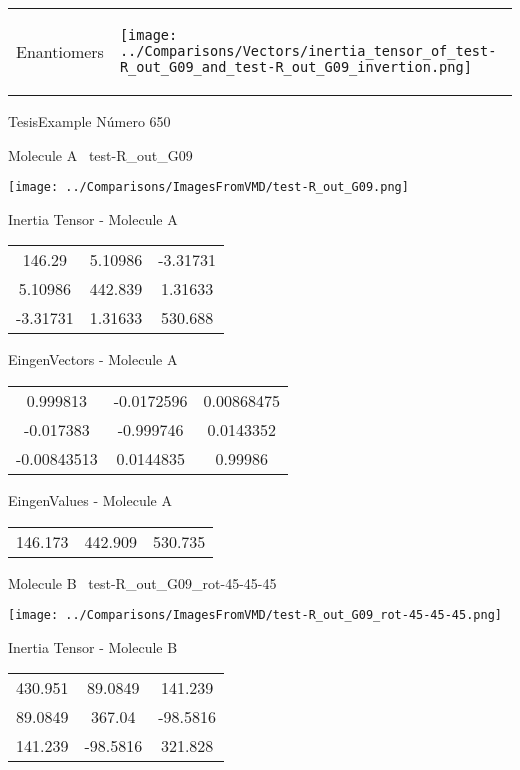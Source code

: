 \vtab[-5mm]
\begin{tabular}{*{2}{m{}}}
\begin{center}
\textcolor{NavyBlue}{\Large Enantiomers}
\end{center}
&
\begin{center}
\texttt{[image: ../Comparisons/Vectors/inertia\_tensor\_of\_test-R\_out\_G09\_and\_test-R\_out\_G09\_invertion.png]}
\end{center}
\end{tabular}

 \newpage

\vtab[-3cm]
\begin{center}
{\large TesisExample \tab Número 650}
\end{center}
\begin{multicols}{2}
\begin{center}

Molecule A \
test-R\_out\_G09

\texttt{[image: ../Comparisons/ImagesFromVMD/test-R\_out\_G09.png]}

Inertia Tensor - Molecule A \\
\begin{tabular}{|c c c|}
146.29	 & 	5.10986	 & 	-3.31731	 \\
5.10986	 & 	442.839	 & 	1.31633	 \\
-3.31731	 & 	1.31633	 & 	530.688
\end{tabular}

\vtab
 EingenVectors - Molecule A     \\
\begin{tabular}{|c c c|}
0.999813	 & 	-0.0172596	 & 	0.00868475	 \\
-0.017383	 & 	-0.999746	 & 	0.0143352	 \\
-0.00843513	 & 	0.0144835	 & 	0.99986
\end{tabular}

\vtab
 EingenValues - Molecule A     \\
\begin{tabular}{|c c c|}
146.173	 & 	442.909	 & 	530.735	 \\
\end{tabular}
\columnbreak

Molecule B \
test-R\_out\_G09\_rot-45-45-45

\texttt{[image: ../Comparisons/ImagesFromVMD/test-R\_out\_G09\_rot-45-45-45.png]}

Inertia Tensor - Molecule B \\
\begin{tabular}{|c c c|}
430.951	 & 	89.0849	 & 	141.239	 \\
89.0849	 & 	367.04	 & 	-98.5816	 \\
141.239	 & 	-98.5816	 & 	321.828
\end{tabular}


\end{center}
\end{multicols}
